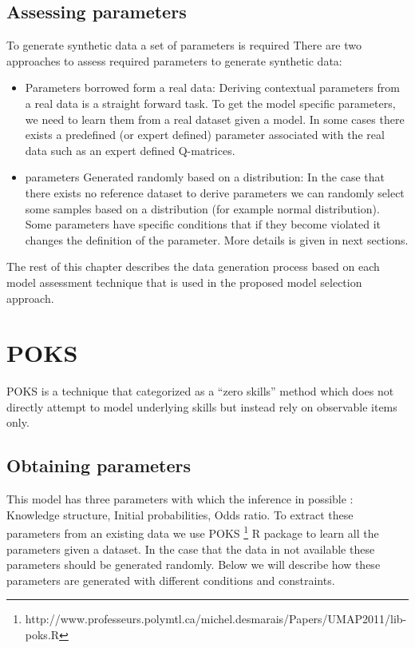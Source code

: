 \subsection{Assessing parameters}

To generate synthetic data a set of parameters is required There are two approaches to assess required parameters to generate synthetic data:
\begin{itemize}
\item Parameters borrowed form a real data: Deriving contextual parameters from a real data is a straight forward task. To get the model specific parameters, we need to learn them from a real dataset given a model. In some cases there exists a predefined (or expert defined) parameter associated with the real data such as an expert defined Q-matrices.
\item parameters Generated randomly based on a distribution: In the case that there exists no reference dataset to derive parameters we can randomly select some samples based on a distribution (for example normal distribution). Some parameters have specific conditions that if they become violated it changes the definition of the parameter. More details is given in next sections.

\end{itemize}


The rest of this chapter describes the data generation process based on each model assessment technique that is used in the proposed model selection approach.

\section{POKS}
POKS is a technique that categorized as a ``zero skills'' method which does not directly attempt to model underlying skills but instead rely on observable items only. 

\subsection{Obtaining parameters}
This model has three parameters with which the inference in possible : Knowledge structure, Initial probabilities, Odds ratio. To extract these parameters from an existing data we use POKS \footnote{http://www.professeurs.polymtl.ca/michel.desmarais/Papers/UMAP2011/lib-poks.R} R package to learn all the parameters given a dataset. In the case that the data in not available these parameters should be generated randomly. Below we will describe how these parameters are generated with different conditions and constraints.
